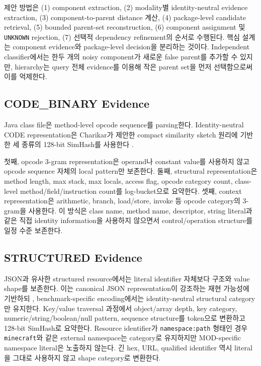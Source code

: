 \documentclass[runningheads]{llncs}
\begin{document}
제안 방법은 (1) component extraction, (2) modality별 identity-neutral evidence extraction, (3) component-to-parent distance 계산, (4) package-level candidate retrieval, (5) bounded parent-set reconstruction, (6) component assignment 및 \texttt{UNKNOWN} rejection, (7) 선택적 dependency refinement의 순서로 수행된다. 핵심 설계는 component evidence와 package-level decision을 분리하는 것이다. Independent classifier에서는 한두 개의 noisy component가 새로운 false parent를 추가할 수 있지만, hierarchy는 query 전체 evidence를 이용해 작은 parent set을 먼저 선택함으로써 이를 억제한다.

\subsection{CODE\_BINARY Evidence}

Java class file은 method-level opcode sequence를 parsing한다. Identity-neutral CODE representation은 Charikar가 제안한 compact similarity sketch 원리에 기반한 세 종류의 128-bit SimHash를 사용한다 \cite{charikar2002simhash}.

첫째, opcode 3-gram representation은 operand나 constant value를 사용하지 않고 opcode sequence 자체의 local pattern만 보존한다. 둘째, structural representation은 method length, max stack, max locals, access flag, opcode category count, class-level method/field/instruction count를 log-bucket으로 요약한다. 셋째, context representation은 arithmetic, branch, load/store, invoke 등 opcode category의 3-gram을 사용한다. 이 방식은 class name, method name, descriptor, string literal과 같은 직접 identity information을 사용하지 않으면서 control/operation structure를 일정 수준 보존한다.

\subsection{STRUCTURED Evidence}

JSON과 유사한 structured resource에서는 literal identifier 자체보다 구조와 value shape를 보존한다. 이는 canonical JSON representation이 강조하는 재현 가능성에 기반하되 \cite{rundgren2020jcs}, benchmark-specific encoding에서는 identity-neutral structural category만 유지한다. Key/value traversal 과정에서 object/array depth, key category, numeric/string/boolean/null pattern, sequence structure를 token으로 변환하고 128-bit SimHash로 요약한다. Resource identifier가 \texttt{namespace:path} 형태인 경우 \texttt{minecraft}와 같은 external namespace는 category로 유지하지만 MOD-specific namespace literal은 노출하지 않는다. 긴 hex, URL, qualified identifier 역시 literal을 그대로 사용하지 않고 shape category로 변환한다.
\end{document}
